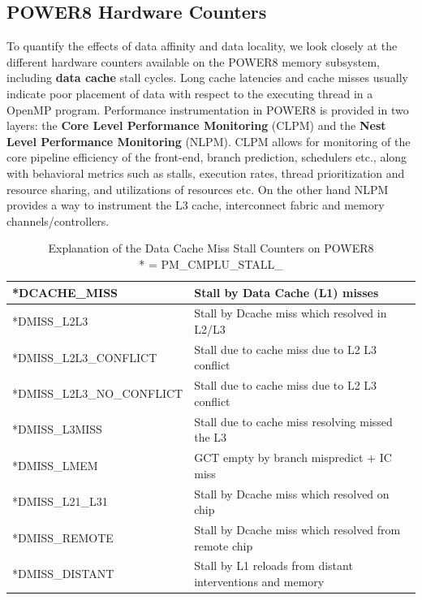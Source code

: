 \subsection{POWER8 Hardware Counters}
To quantify the effects of data affinity and data locality, we look closely at the different hardware counters available on the POWER8 memory subsystem, including \textbf{data cache} stall cycles. Long cache latencies and cache misses usually indicate poor placement of data with respect to the executing thread in a OpenMP program. Performance instrumentation in POWER8 is provided in two layers: the \textbf{Core Level Performance Monitoring} (CLPM) and the \textbf{Nest Level Performance Monitoring} (NLPM). CLPM allows for monitoring of the core pipeline efficiency of the front-end, branch prediction, schedulers etc., along with behavioral metrics such as stalls, execution rates, thread prioritization and resource sharing, and utilizations of resources etc. On the other hand NLPM provides a way to instrument the L3 cache, interconnect fabric and memory channels/controllers. 
%
\begin{table}[h]
\vspace{-0.5pc}
\centering
\begin{tabular} { | l | l |}
\hline
*DCACHE\_MISS & Stall by Data Cache (L1) misses\\  \hline
*DMISS\_L2L3 & Stall by Dcache miss which resolved in L2/L3 \\  \hline
*DMISS\_L2L3\_CONFLICT & Stall due to cache miss due to L2 L3 conflict \\  \hline
*DMISS\_L2L3\_NO\_CONFLICT & Stall due to cache miss due to L2 L3 conflict \\ \hline
*DMISS\_L3MISS & Stall due to cache miss resolving missed the L3 \\ \hline
*DMISS\_LMEM & GCT empty by branch mispredict + IC miss\\ \hline
*DMISS\_L21\_L31 &  Stall by Dcache miss which resolved on chip \\ \hline%
*DMISS\_REMOTE  & Stall by Dcache miss which resolved from remote chip \\ \hline%
*DMISS\_DISTANT & Stall by L1 reloads from distant interventions and memory \\ \hline
 \end{tabular}
 \caption{Explanation of the Data Cache Miss Stall Counters on POWER8 \\ * = PM\_CMPLU\_STALL\_}
\label{tab:hwct}
\end{table}
